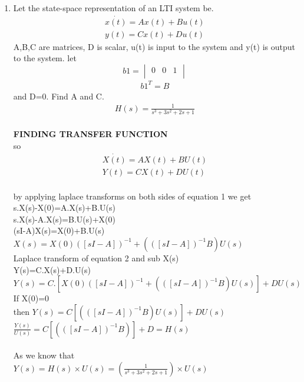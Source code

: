 \begin{enumerate}[label=\thesection.\arabic*.,ref=\thesection.\theenumi]
\item Let the state-space representation of an LTI system be.
\begin{align*}
 \dot{x(t)}=Ax(t)+Bu(t) \\
 y(t)=Cx(t)+Du(t)
\end{align*}
A,B,C are matrices, D is scalar, u(t) is input to the system and y(t) is output to the system. let
\begin{equation}
 b1 =\begin{vmatrix}
  0&0&1\\
 \end{vmatrix}
\end{equation}
\begin{align}
b1^T=B
\end{align}
and D=0. Find A and C.
\begin{align}
H(s)=\frac{1}{s^3+3s^2+2s+1}
\end{align}
\solution
\\ \textbf{FINDING TRANSFER FUNCTION}
\\so
\begin{align*}
 \dot{X(t)}=AX(t)+BU(t) \\
 Y(t)=CX(t)+DU(t)
\end{align*}    
\\by applying laplace transforms on both sides of equation 1
we get
\\s.X(s)-X(0)=A.X(s)+B.U(s)
\\s.X(s)-A.X(s)=B.U(s)+X(0)
\\(sI-A)X(s)=X(0)+B.U(s)
\\$X(s)=X(0)([sI-A])^{-1}+(([sI-A])^{-1}B)U(s)$
\\Laplace transform of equation 2 and sub X(s) 
\\Y(s)=C.X(s)+D.U(s)
\\$Y(s)=C.[X(0)([sI-A])^{-1 }+ (([sI-A])^{-1}B)U(s)]+DU(s)$
\\If X(0)=0
\\then $Y(s)=C[(([sI-A])^{-1}B)U(s)]+DU(s)$
\\$\frac{Y(s)}{U(s)}=C[(([sI-A])^{-1}B)]+D=H(s)$
\\
\\ As we know that
\\ $Y(s)=H(s) \times U(s)= (\frac{1}{s^3+3s^2+2s+1}) \times U(s) $

\end{enumerate}
